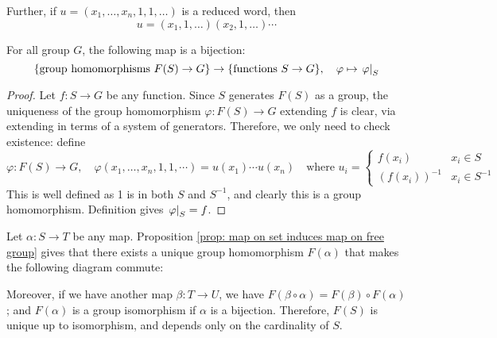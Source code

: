 \documentclass{article}
\begin{document}
Further, if $u = (x_1, \dots, x_n, 1, 1, \dots)$ is a reduced word, then
\[
    u = (x_1, 1, \dots) (x_2, 1, \dots) \cdots
\]

\begin{proposition}\label{prop: map on set induces map on free group}
    For all group $G$, the following map is a bijection:
    \[
        \{ \text{group homomorphisms $F(S) \to G$} \} \to \{ \text{functions $S \to G$} \}, \quad \varphi \mapsto \left.\varphi\right|_{S}
    \]
\end{proposition}

\begin{proof}
    Let $f: S \to G$ be any function. Since $S$ generates $F(S)$ as a group, the uniqueness of the group homomorphism $\varphi: F(S) \to G$ extending $f$ is clear, via extending in terms of a system of generators. Therefore, we only need to check existence: define
    \[
        \varphi: F(S) \to G, \quad \varphi(x_1, \dots, x_n, 1, 1, \cdots) = u(x_1) \cdots u(x_n) \quad \text{where }
        u_i = \begin{cases}
            f(x_i) & x_i \in S\\
            (f(x_i))^{-1} & x_i \in S^{-1}
        \end{cases}
    \]
    This is well defined as 1 is in both $S$ and $S^{-1}$, and clearly this is a group homomorphism. Definition gives $\left.\varphi\right|_{S} = f$.
\end{proof}

\begin{remark}
    Let $\alpha: S \to T$ be any map. Proposition \ref{prop: map on set induces map on free group} gives that there exists a unique group homomorphism $F(\alpha)$ that makes the following diagram commute:
    \begin{minipage}{\linewidth}
        \centering
    \end{minipage}
    Moreover, if we have another map $\beta: T \to U$, we have $F(\beta \circ \alpha) = F(\beta) \circ F(\alpha)$; and $F(\alpha)$ is a group isomorphism if $\alpha$ is a bijection. Therefore, $F(S)$ is unique up to isomorphism, and depends only on the cardinality of $S$.
\end{remark}
\end{document}
